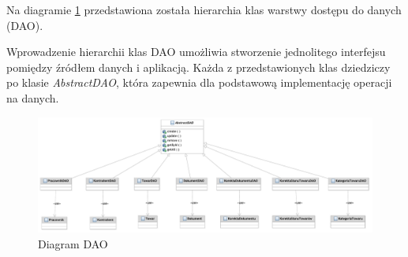 Na diagramie \ref{fig:DiagramDAO} przedstawiona została hierarchia klas warstwy dostępu do danych (DAO).

Wprowadzenie hierarchii klas DAO umożliwia stworzenie jednolitego interfejsu pomiędzy źródłem danych i aplikacją. Każda z przedstawionych klas dziedziczy po klasie \textit{AbstractDAO}, która zapewnia dla podstawową implementację operacji na danych.

\begin{figure}[!htb]
  \begin{center}
    \includegraphics[scale=0.4]{../img/model/diagram_dao.pdf}
  \end{center}
  \caption{Diagram DAO}
  \label{fig:DiagramDAO}
\end{figure}
\FloatBarrier